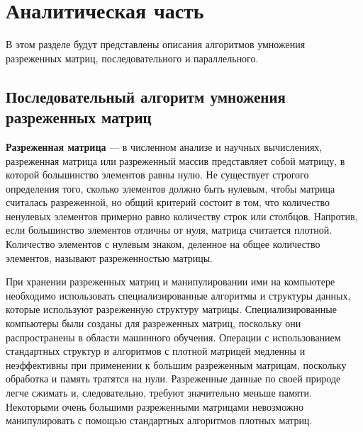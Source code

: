 \chapter{Аналитическая часть}
В этом разделе будут представлены описания алгоритмов умножения разреженных матриц, последовательного и параллельного.

\section{Последовательный алгоритм умножения разреженных матриц}

\textbf{Разреженная матрица} \cite{sheyker} — в численном анализе и научных вычислениях, разреженная матрица или разреженный массив представляет собой матрицу, в которой большинство элементов равны нулю. Не существует строгого определения того, сколько элементов должно быть нулевым, чтобы матрица считалась разреженной, но общий критерий состоит в том, что количество ненулевых элементов примерно равно количеству строк или столбцов. Напротив, если большинство элементов отличны от нуля, матрица считается плотной. Количество элементов с нулевым знаком, деленное на общее количество элементов, называют разреженностью матрицы.

При хранении разреженных матриц и манипулировании ими на компьютере необходимо использовать специализированные алгоритмы и структуры данных, которые используют разреженную структуру матрицы. Специализированные компьютеры были созданы для разреженных матриц, поскольку они распространены в области машинного обучения. Операции с использованием стандартных структур и алгоритмов с плотной матрицей медленны и неэффективны при применении к большим разреженным матрицам, поскольку обработка и память тратятся на нули. Разреженные данные по своей природе легче сжимать и, следовательно, требуют значительно меньше памяти. Некоторыми очень большими разреженными матрицами невозможно манипулировать с помощью стандартных алгоритмов плотных матриц.

